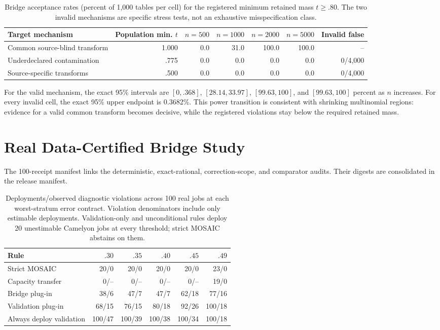\begin{table}[t]
\centering
\small
\setlength{\tabcolsep}{5.2pt}
\begin{tabular}{lrrrrrr}
\hline
Target mechanism & Population min. $t$ & $n=500$ & $n=1000$ & $n=2000$ & $n=5000$ & Invalid false \\
\hline
Common source-blind transform & 1.000 & 0.0 & 31.0 & 100.0 & 100.0 & -- \\
Underdeclared contamination & .775 & 0.0 & 0.0 & 0.0 & 0.0 & 0/4,000 \\
Source-specific transforms & .500 & 0.0 & 0.0 & 0.0 & 0.0 & 0/4,000 \\
\hline
\end{tabular}
\caption{Bridge acceptance rates (percent of 1,000 tables per cell) for the
registered minimum retained mass $t\geq.80$. The two invalid mechanisms are
specific stress tests, not an exhaustive misspecification class.}
\label{supp:tab:bridge-misspecification}
\end{table}

For the valid mechanism, the exact 95\% intervals are $[0,.368]$,
$[28.14,33.97]$, $[99.63,100]$, and $[99.63,100]$ percent as $n$ increases.
For every invalid cell, the exact 95\% upper endpoint is 0.3682\%. This power
transition is consistent with shrinking multinomial regions: evidence for a
valid common transform becomes decisive, while the registered violations stay
below the required retained mass.

\section{Real Data-Certified Bridge Study}

The 100-receipt manifest links the deterministic, exact-rational,
correction-scope, and comparator audits. Their digests are consolidated in the
release manifest.

\begin{table}[t]
\centering
\small
\setlength{\tabcolsep}{4.6pt}
\begin{tabular}{lrrrrr}
\hline
Rule & $.30$ & $.35$ & $.40$ & $.45$ & $.49$ \\
\hline
Strict MOSAIC & 20/0 & 20/0 & 20/0 & 20/0 & 23/0 \\
Capacity transfer & 0/-- & 0/-- & 0/-- & 0/-- & 19/0 \\
Bridge plug-in & 38/6 & 47/7 & 47/7 & 62/18 & 77/16 \\
Validation plug-in & 68/15 & 76/15 & 80/18 & 92/26 & 100/18 \\
Always deploy validation & 100/47 & 100/39 & 100/38 & 100/34 & 100/18 \\
\hline
\end{tabular}
\caption{Deployments/observed diagnostic violations across 100 real jobs at
each worst-stratum error contract. Violation denominators include only
estimable deployments. Validation-only and unconditional rules deploy 20
unestimable Camelyon jobs at every threshold; strict MOSAIC abstains on them.}
\label{supp:tab:real-bridge-thresholds}
\end{table}


